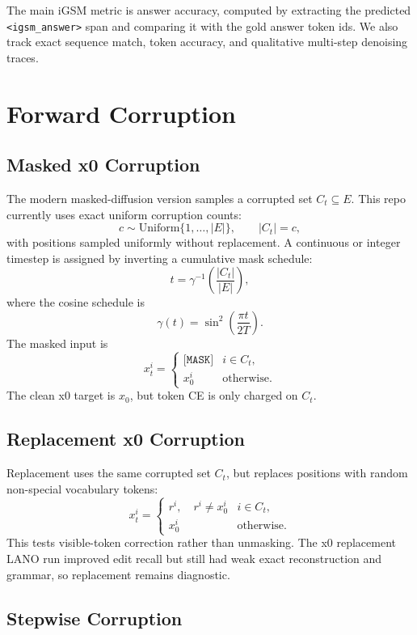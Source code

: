 \documentclass[11pt]{article}
\begin{document}
The main iGSM metric is answer accuracy, computed by extracting the predicted
\texttt{<igsm\_answer>} span and comparing it with the gold answer token ids.
We also track exact sequence match, token accuracy, and qualitative
multi-step denoising traces.

\section{Forward Corruption}

\subsection{Masked x0 Corruption}

The modern masked-diffusion version samples a corrupted set $C_t \subseteq E$.
This repo currently uses exact uniform corruption counts:
\[
  c \sim \mathrm{Uniform}\{1,\ldots,|E|\}, \qquad |C_t|=c,
\]
with positions sampled uniformly without replacement.  A continuous or integer
timestep is assigned by inverting a cumulative mask schedule:
\[
  t = \gamma^{-1}\left(\frac{|C_t|}{|E|}\right),
\]
where the cosine schedule is
\[
  \gamma(t) = \sin^2\left(\frac{\pi t}{2T}\right).
\]
The masked input is
\[
  x_t^i =
  \begin{cases}
    \texttt{[MASK]} & i \in C_t,\\
    x_0^i & \text{otherwise.}
  \end{cases}
\]
The clean x0 target is $x_0$, but token CE is only charged on $C_t$.

\subsection{Replacement x0 Corruption}

Replacement uses the same corrupted set $C_t$, but replaces positions with
random non-special vocabulary tokens:
\[
  x_t^i =
  \begin{cases}
    r^i, \quad r^i \neq x_0^i & i \in C_t,\\
    x_0^i & \text{otherwise.}
  \end{cases}
\]
This tests visible-token correction rather than unmasking.  The x0 replacement
LANO run improved edit recall but still had weak exact reconstruction and
grammar, so replacement remains diagnostic.

\subsection{Stepwise Corruption}
\end{document}
